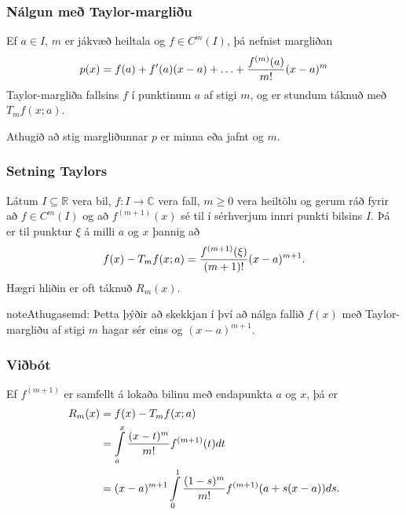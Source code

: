 \documentclass[a4paper,10pt,icelandic]{sphinxmanual}
\begin{document}

\subsubsection{Nálgun með Taylor-margliðu}
\label{kafli01:nalgun-me-taylor-margliu}\label{kafli01:index-2}
Ef \(a \in I\), \(m\) er jákvæð heiltala og
\(f \in C^{m}(I)\), þá nefnist margliðan
\begin{gather}
\begin{split}p(x) = f(a) + f'(a)(x-a) + \ldots   + \frac{f^{(m)}(a)}{m!}(x-a)^m\end{split}\notag
\end{gather}
Taylor-margliða fallsins \(f\) í punktinum \(a\) af stigi
\(m\), og er stundum táknuð með \(T_m f(x;a)\).

Athugið að stig margliðunnar \(p\) er minna eða jafnt og \(m\).


\subsubsection{Setning Taylors}
\label{kafli01:index-3}\label{kafli01:id1}
Látum \(I \subseteq {\mathbb  R}\) vera bil, \(f : I \to
{\mathbb  C}\) vera fall, \(m \geq 0\) vera heiltölu og gerum ráð
fyrir að \(f \in
C^m(I)\) og að \(f^{(m+1)}(x)\) sé til í sérhverjum innri punkti
bilsins \(I\). Þá er til punktur \(\xi\) á milli \(a\) og
\(x\) þannig að
\begin{gather}
\begin{split}f(x) - T_mf(x;a)= \frac{f^{(m+1)}(\xi)}{(m+1)!}(x-a)^{m+1}.\end{split}\notag
\end{gather}
Hægri hliðin er oft táknuð \(R_m(x)\).

\begin{notice}{note}{Athugasemd:}
Þetta þýðir að skekkjan í því að nálga fallið \(f(x)\) með
Taylor-margliðu af stigi \(m\) hagar sér eins og
\((x-a)^{m+1}\).
\end{notice}


\subsubsection{Viðbót}
\label{kafli01:vibot}
Ef \(f^{(m+1)}\) er samfellt á lokaða bilinu með endapunkta
\(a\) og \(x\), þá er
\begin{gather}
\begin{split}\begin{aligned}
  R_m(x) &= f(x) - T_mf(x;a) \\
  &= \int\limits_a^x \frac{(x-t)^m}{m!}f^{(m+1)}(t) dt \notag \\
  &= (x-a)^{m+1} \int\limits_0^1 \frac{(1-s)^m}{m!} f^{(m+1)}(a + s(x-a)) ds.
\end{aligned}\end{split}\notag
\end{gather}
\end{document}

